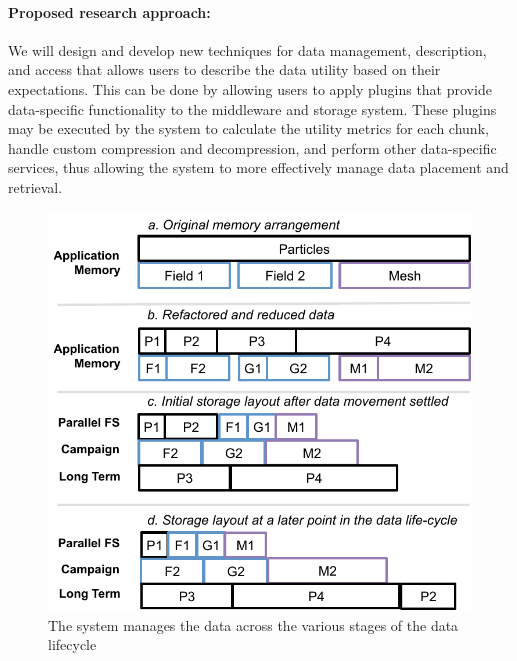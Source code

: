 \paragraph{Proposed research approach:} 
We will design and develop new techniques for data management, description,
and access that allows users to describe the data utility based on their
expectations. This can be done by allowing users to apply plugins that
provide data-specific functionality to the middleware and storage system.
These plugins may be executed by the system to
calculate the utility metrics for each chunk, handle custom compression
and decompression, and perform other data-specific services, thus allowing
the system to more effectively manage data placement and retrieval.
%

\begin{figure}
        \begin{centering}
        \vspace{-4ex}
        \includegraphics[scale=0.7]{graphics/SSIO-bucket.pdf}
        \caption{The system manages the data across the various stages of the data lifecycle}
        \label{fig:ssio-bucket}
        \end{centering}
      \vspace{-1ex}
\end{figure}

